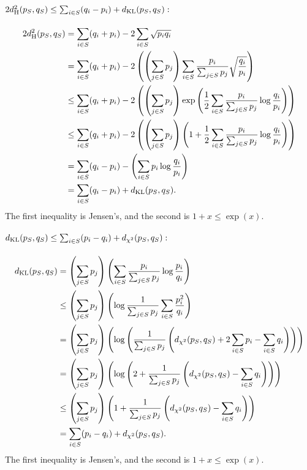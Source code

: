\paragraph{$2d_{\mathrm {H}}^2(p_S, q_S) \leq \sum_{i \in S} (q_i - p_i) + d_{\mathrm {KL}}(p_S, q_S):$}
\begin{align*}
2 d_{\mathrm {H}}^2(p_S, q_S) 
&= \sum_{i \in S} (q_i + p_i) - 2\sum_{i \in S} \sqrt{p_i q_i} \\
&= \sum_{i \in S} (q_i + p_i) - 2\left(\left(\sum_{j \in S} p_j\right)\sum_{i \in S} \frac{p_i}{\sum_{j \in S} p_j} \sqrt{\frac{q_i}{p_i}}\right) \\
&\leq \sum_{i \in S} (q_i + p_i) - 2\left(\left(\sum_{j \in S} p_j\right)\exp\left(\frac12 \sum_{i \in S} \frac{p_i}{\sum_{j \in S} p_j} \log{\frac{q_i}{p_i}}\right)\right) \\
&\leq \sum_{i \in S} (q_i + p_i) - 2\left(\left(\sum_{j \in S} p_j\right)\left(1 + \frac12 \sum_{i \in S} \frac{p_i}{\sum_{j \in S} p_j} \log{\frac{q_i}{p_i}}\right)\right) \\
&= \sum_{i \in S} (q_i - p_i) - \left(\sum_{i \in S} p_i \log{\frac{q_i}{p_i}} \right)\\
&= \sum_{i \in S} (q_i - p_i) + d_{\mathrm {KL}}(p_S, q_S).
\end{align*}
The first inequality is Jensen's, and the second is $1 + x \leq \exp(x)$.

\paragraph{$d_{\mathrm {KL}}(p_S, q_S) \leq \sum_{i \in S} (p_i - q_i) +  d_{\chi^2}(p_S, q_S):$}
\begin{align*}
d_{\mathrm {KL}}(p_S, q_S) 
&= \left(\sum_{j \in S} p_j\right)\left(\sum_{i \in S} \frac{p_i}{\sum_{j \in S} p_j} \log{\frac{p_i}{q_i}}\right) \\
&\leq \left(\sum_{j \in S} p_j\right)\left(\log {\frac{1}{\sum_{j\in S} p_j}\sum_{i \in S} \frac{p_i^2}{q_i}} \right) \\
&= \left(\sum_{j \in S} p_j\right) \left(\log{ \left(\frac{1}{\sum_{j\in S} p_j} \left(d_{\chi^2}(p_S, q_S) + 2\sum_{i \in S} p_i - \sum_{i \in S} q_i\right)\right)} \right) \\
&= \left(\sum_{j \in S} p_j\right) \left(\log{  \left(2 + \frac{1}{\sum_{j\in S} p_j} \left(d_{\chi^2}(p_S, q_S)  - \sum_{i \in S} q_i\right)\right)} \right) \\
&\leq \left(\sum_{j \in S} p_j\right) \left(1 + \frac{1}{\sum_{j\in S} p_j} \left(d_{\chi^2}(p_S, q_S)  - \sum_{i \in S} q_i\right)\right) \\
&=\sum_{i \in S} (p_i - q_i) +  d_{\chi^2}(p_S, q_S).
\end{align*}
The first inequality is Jensen's, and the second is $1 + x \leq \exp(x)$.
